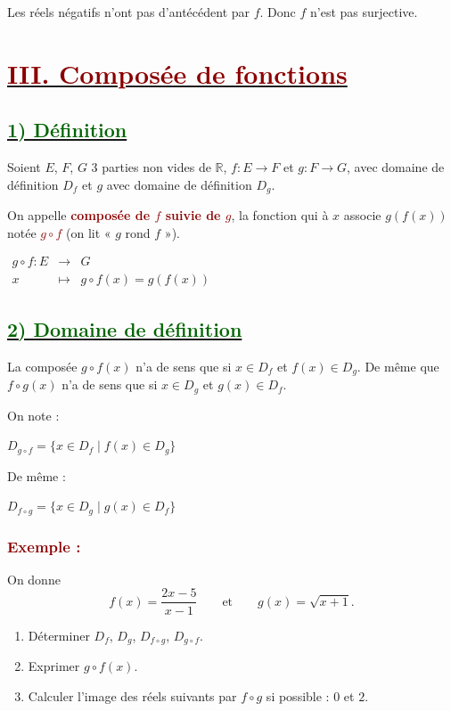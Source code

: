\documentclass[12pt,a4paper]{article}
\begin{document}
Les réels négatifs n'ont pas d'antécédent par $f$.
Donc $f$ n'est pas surjective.


\section*{\underline{\textbf{\textcolor{darkred}{III. Composée de fonctions}}}}

\subsection*{\underline{\textbf{\textcolor{darkgreen}{1) Définition}}}}

Soient $E$, $F$, $G$ 3 parties non vides de $\mathbb{R}$,
$f:E\longrightarrow F$ et $g:F\longrightarrow G$,
avec domaine de définition $D_f$ et $g$ avec domaine de définition $D_g$.

On appelle \textcolor{darkred}{\textbf{composée de $f$ suivie de $g$}},
la fonction qui à $x$ associe $g(f(x))$ notée
\textcolor{darkred}{\textbf{$g\circ f$}} (on lit « $g$ rond $f$ »).

\(
\begin{array}{rcl}
g\circ f:E & \longrightarrow & G\\
x & \longmapsto & g\circ f(x)=g(f(x))
\end{array}
\)


\subsection*{\underline{\textbf{\textcolor{darkgreen}{2) Domaine de définition}}}}

La composée $g\circ f(x)$ n'a de sens que si $x\in D_f$ et
$f(x)\in D_g$. De même que $f\circ g(x)$ n'a de sens que si
$x\in D_g$ et $g(x)\in D_f$.

On note :

\(
\boxed{
D_{g\circ f}=\{x\in D_f\mid f(x)\in D_g\}
}
\)

De même :

\(
\boxed{
D_{f\circ g}=\{x\in D_g\mid g(x)\in D_f\}
}
\)

\subsubsection*{\textcolor{darkred}{Exemple :}}

On donne
\[
f(x)=\frac{2x-5}{x-1}
\qquad\text{et}\qquad
g(x)=\sqrt{x+1}.
\]

\begin{enumerate}
    \item Déterminer $D_f$, $D_g$, $D_{f\circ g}$, $D_{g\circ f}$.
    
    \item Exprimer $g\circ f(x)$.
    
    \item Calculer l'image des réels suivants par $f\circ g$ si possible :
    $0$ et $2$.
\end{enumerate}
\end{document}
